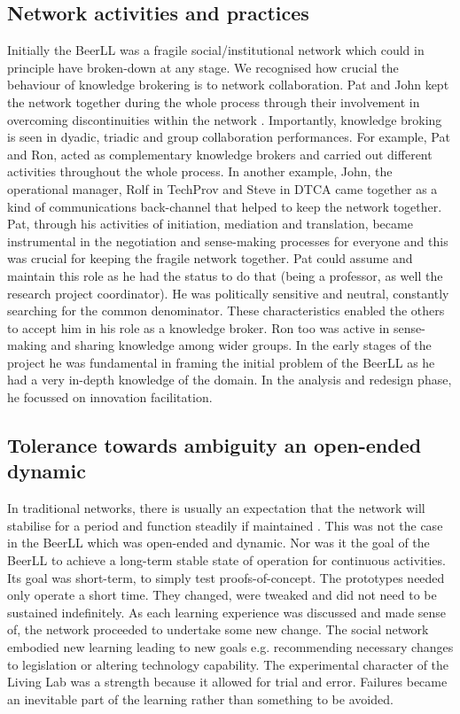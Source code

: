 \documentclass[graybox]{styles/svmult}
\begin{document}
\subsection{Network activities and practices}
Initially the BeerLL was a fragile social/institutional network which could in principle have broken-down at any stage. We recognised how crucial the behaviour of knowledge brokering is to network collaboration. Pat and John kept the network together during the whole process through their involvement in overcoming discontinuities within the network \citep{beth2002discontinuities}. 
Importantly, knowledge broking is seen in dyadic, triadic and group collaboration performances. For example, Pat and Ron, acted as complementary knowledge brokers and carried out different activities throughout the whole process. 
In another example, John, the operational manager, Rolf in TechProv and Steve in DTCA came together as a kind of communications back-channel that helped to keep the network together. 
Pat, through his activities of initiation, mediation and translation, became instrumental in the negotiation and sense-making processes for everyone and this was crucial for keeping the fragile network together. Pat could assume and maintain this role as he had the status to do that (being a professor, as well the research project coordinator).
He was politically sensitive and neutral, constantly searching for the common denominator. These characteristics enabled the others to accept him in his role as a knowledge broker. 
Ron too was active in sense-making and sharing knowledge among wider groups. In the early stages of the project he was fundamental in framing the initial problem of the BeerLL as he had a very in-depth knowledge of the domain. In the analysis and redesign phase, he focussed on innovation facilitation. 



\subsection{Tolerance towards ambiguity an open-ended dynamic}
In traditional networks, there is usually an expectation that the network will stabilise for a period and function steadily if maintained \citep{Riemer2006}. This was not the case in the BeerLL which was open-ended and dynamic. Nor was it the goal of the BeerLL to achieve a long-term stable state of operation for continuous activities. Its goal was short-term, to simply test proofs-of-concept. The prototypes needed only operate a short time. They changed, were tweaked and did not need to be sustained indefinitely. As each learning experience was discussed and made sense of, the network proceeded to undertake some new change. The social network embodied new learning leading to new goals e.g. recommending necessary changes to legislation or altering technology capability. The experimental character of the Living Lab was a strength because it allowed for trial and error. Failures became an inevitable part of the learning rather than something to be avoided.
\end{document}
